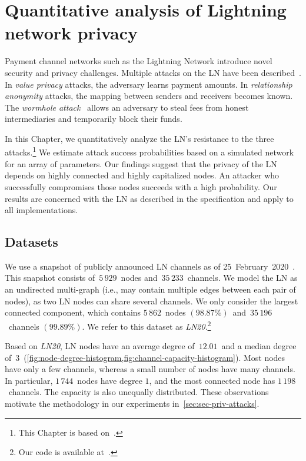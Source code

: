 \chapter{Quantitative analysis of Lightning network privacy}

\label{Chapter07LNattacks}

Payment channel networks such as the Lightning Network introduce novel security and privacy challenges.
Multiple attacks on the LN have been described~\cite{Malavolta2017}.
In \textit{value privacy} attacks, the adversary learns payment amounts.
In \textit{relationship anonymity} attacks, the mapping between senders and receivers becomes known.
The \textit{wormhole attack}~\cite{Malavolta2019} allows an adversary to steal fees from honest intermediaries and temporarily block their funds.

In this Chapter, we quantitatively analyze the LN's resistance to the three attacks.\footnote{This Chapter is based on~\cite{Tikhomirov2020a}.}
We estimate attack success probabilities based on a simulated network for an array of parameters.
Our findings suggest that the privacy of the LN depends on highly connected and highly capitalized nodes.
An attacker who successfully compromises those nodes succeeds with a high probability.
Our results are concerned with the LN as described in the specification and apply to all implementations.


\section{Datasets}
\label{sec:datasets}

We use a snapshot of publicly announced LN channels as of 25~February~2020~\cite{fiatjaf2020}.
This snapshot consists of~$5\,929$~nodes and~$35\,233$~channels.
We model the LN as an undirected multi-graph (i.e., may contain multiple edges between each pair of nodes), as two LN nodes can share several channels.
We only consider the largest connected component, which contains $5\,862$~nodes $(98.87\%)$~and~$35\,196$~channels $(99.89\%)$.
We refer to this dataset as \emph{LN20}.\footnote{Our code is available at~\cite{Tikhomirov2019}.}

Based on \emph{LN20}, 
LN nodes have an average degree of~$12.01$~and a median degree of~$3$~(\cref{fig:node-degree-histogram,fig:channel-capacity-histogram}).
Most nodes have only a few channels, whereas a small number of nodes have many channels.
In particular, $1\,744$~nodes have degree $1$, and the most connected node has $1\,198$~channels.
The capacity is also unequally distributed.
These observations motivate the methodology in our experiments in~\cref{sec:sec-priv-attacks}.

